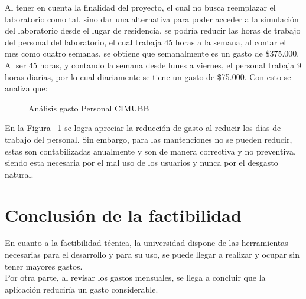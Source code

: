 Al tener en cuenta la finalidad del proyecto, el cual no busca reemplazar el laboratorio como tal, sino dar una alternativa para poder acceder a la simulación del laboratorio desde el lugar de residencia, se podría reducir las horas de trabajo del personal del laboratorio, el cual trabaja 45 horas a la semana, al contar el mes como cuatro semanas, se obtiene que semanalmente es un gasto de \$375.000. Al ser 45 horas, y contando la semana desde lunes a viernes, el personal trabaja 9 horas diarias, por lo cual diariamente se tiene un gasto de \$75.000. Con esto se analiza que:

\begin{figure}[h]
\centering
\caption{Análisis gasto Personal CIMUBB}
\label{gasto}
\end{figure}

En la Figura ~\ref{gasto} se logra apreciar la reducción de gasto al reducir los días de trabajo del personal. Sin embargo, para las mantenciones no se pueden reducir, estas son contabilizadas anualmente y son de manera correctiva y no preventiva, siendo esta necesaria por el mal uso de los usuarios y nunca por el desgasto natural.  
\section{Conclusión de la factibilidad}
En cuanto a la factibilidad técnica, la universidad dispone de las herramientas necesarias para el desarrollo y para su uso, se puede llegar a realizar y ocupar sin tener mayores gastos. \\
Por otra parte, al revisar los gastos mensuales, se llega a concluir que la aplicación reduciría un gasto considerable.